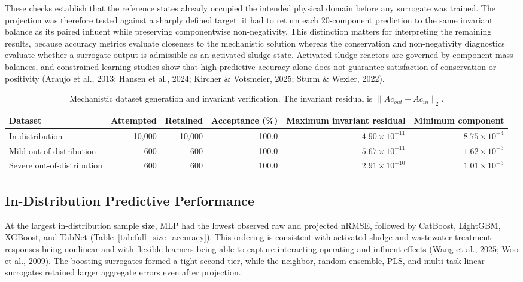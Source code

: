 \documentclass[a4paper,fleqn]{cas-sc}
\newcommand{\csvcomma}{,}
\begin{document}
These checks establish that the reference states already occupied the intended physical domain before any surrogate was trained. The projection was therefore tested against a sharply defined target: it had to return each 20-component prediction to the same invariant balance as its paired influent while preserving componentwise non-negativity. This distinction matters for interpreting the remaining results, because accuracy metrics evaluate closeness to the mechanistic solution whereas the conservation and non-negativity diagnostics evaluate whether a surrogate output is admissible as an activated sludge state. Activated sludge reactors are governed by component mass balances, and constrained-learning studies show that high predictive accuracy alone does not guarantee satisfaction of conservation or positivity (Araujo et al., 2013; Hansen et al., 2024; Kircher \& Votsmeier, 2025; Sturm \& Wexler, 2022).

\FloatBarrier
\begin{table}[H]
\centering
\caption{Mechanistic dataset generation and invariant verification. The invariant residual is $\|Ac_{out}-Ac_{in}\|_2$.}
\label{tab:dataset_validation}
\scriptsize
\begin{tabular}{lrrrrr}
\toprule
Dataset & Attempted & Retained & Acceptance (\%) & Maximum invariant residual & Minimum component \\
\midrule
In-distribution & 10\csvcomma{}000 & 10\csvcomma{}000 & 100.0 & $4.90\times10^{-11}$ & $8.75\times10^{-4}$ \\
Mild out-of-distribution & 600 & 600 & 100.0 & $5.67\times10^{-11}$ & $1.62\times10^{-3}$ \\
Severe out-of-distribution & 600 & 600 & 100.0 & $2.91\times10^{-10}$ & $1.01\times10^{-3}$ \\
\bottomrule
\end{tabular}
\end{table}

\subsection{In-Distribution Predictive Performance}

At the largest in-distribution sample size, MLP had the lowest observed raw and projected nRMSE, followed by CatBoost, LightGBM, XGBoost, and TabNet (Table~\ref{tab:full_size_accuracy}). This ordering is consistent with activated sludge and wastewater-treatment responses being nonlinear and with flexible learners being able to capture interacting operating and influent effects (Wang et al., 2025; Woo et al., 2009). The boosting surrogates formed a tight second tier, while the neighbor, random-ensemble, PLS, and multi-task linear surrogates retained larger aggregate errors even after projection.
\end{document}
